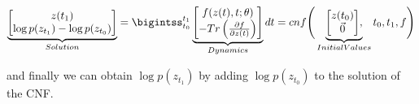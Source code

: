 \begin{displaymath}
    \underbrace{
        \begin{matrix}
            \begin{bmatrix}
                z(t_1) \\
                \log p(z_{t_1}) - \log p(z_{t_0})
            \end{bmatrix}
        \end{matrix}
    }_{Solution}
    =
        \bigintss_{t_0}^{t_1}
        \underbrace{
            \begin{matrix}
                \begin{bmatrix}
                    f(z(t), t; \theta) \\
                    -Tr \left ( \frac{\partial f}{\partial z(t)} \right)
                \end{bmatrix}
            \end{matrix}
    }_{Dynamics}
    dt = cnf
    \Bigg (
        \underbrace{
            \begin{matrix}
                \begin{bmatrix}
                    z(t_0) \\
                    \Vec{0}
                \end{bmatrix}
            \end{matrix},
        }_{Initial Values}
        t_0, t_1, f
    \Bigg )
\end{displaymath}

and finally we can obtain $ \log p(z_{t_1}) $ by adding $ \log p(z_{t_0}) $ to the solution of the CNF.
